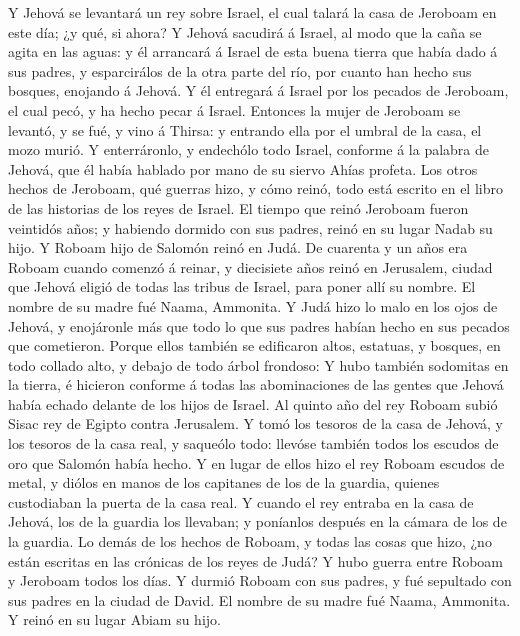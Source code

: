 Y Jehová se levantará un rey sobre Israel, el cual
talará la casa de Jeroboam en este día; ¿y qué, si ahora?
 Y Jehová sacudirá á Israel, al modo que la caña se agita
en las aguas: y él arrancará á Israel de esta buena tierra que había
dado á sus padres, y esparcirálos de la otra parte del río, por cuanto
han hecho sus bosques, enojando á Jehová.  Y él entregará
á Israel por los pecados de Jeroboam, el cual pecó, y ha hecho pecar á
Israel.  Entonces la mujer de Jeroboam se levantó, y se
fué, y vino á Thirsa: y entrando ella por el umbral de la casa, el mozo
murió.  Y enterráronlo, y endechólo todo Israel, conforme
á la palabra de Jehová, que él había hablado por mano de su siervo Ahías
profeta.  Los otros hechos de Jeroboam, qué guerras hizo,
y cómo reinó, todo está escrito en el libro de las historias de los
reyes de Israel.  El tiempo que reinó Jeroboam fueron
veintidós años; y habiendo dormido con sus padres, reinó en su lugar
Nadab su hijo.  Y Roboam hijo de Salomón reinó en Judá.
De cuarenta y un años era Roboam cuando comenzó á reinar, y diecisiete
años reinó en Jerusalem, ciudad que Jehová eligió de todas las tribus de
Israel, para poner allí su nombre. El nombre de su madre fué Naama,
Ammonita.  Y Judá hizo lo malo en los ojos de Jehová, y
enojáronle más que todo lo que sus padres habían hecho en sus pecados
que cometieron.  Porque ellos también se edificaron
altos, estatuas, y bosques, en todo collado alto, y debajo de todo árbol
frondoso:  Y hubo también sodomitas en la tierra, é
hicieron conforme á todas las abominaciones de las gentes que Jehová
había echado delante de los hijos de Israel.  Al quinto
año del rey Roboam subió Sisac rey de Egipto contra Jerusalem.
 Y tomó los tesoros de la casa de Jehová, y los tesoros
de la casa real, y saqueólo todo: llevóse también todos los escudos de
oro que Salomón había hecho.  Y en lugar de ellos hizo el
rey Roboam escudos de metal, y diólos en manos de los capitanes de los
de la guardia, quienes custodiaban la puerta de la casa real.
 Y cuando el rey entraba en la casa de Jehová, los de la
guardia los llevaban; y poníanlos después en la cámara de los de la
guardia.  Lo demás de los hechos de Roboam, y todas las
cosas que hizo, ¿no están escritas en las crónicas de los reyes de Judá?
 Y hubo guerra entre Roboam y Jeroboam todos los días.
 Y durmió Roboam con sus padres, y fué sepultado con sus
padres en la ciudad de David. El nombre de su madre fué Naama, Ammonita.
Y reinó en su lugar Abiam su hijo.

